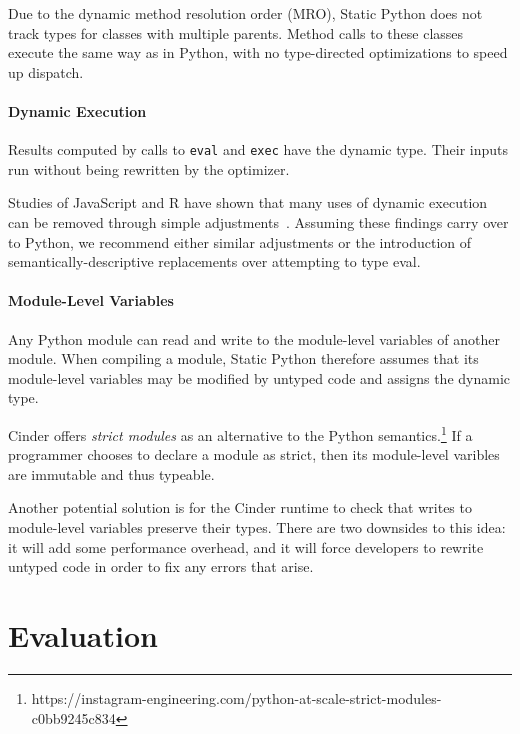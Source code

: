 \documentclass[english,cleveref,submission]{programming}
\newcommand{\SP}{Static Python}
\newcommand{\code}[1]{\texttt{#1}}
\begin{document}
Due to the dynamic method resolution order (MRO),
\SP{} does not track types for classes with multiple parents.
Method calls to these classes execute the same way as
in Python, with no type-directed optimizations to speed up dispatch.


\paragraph{Dynamic Execution}
Results computed by calls to \code{eval} and \code{exec}
have the dynamic type.
Their inputs run without being rewritten
by the optimizer.

Studies of JavaScript and R have shown that many uses of dynamic execution
can be removed through simple adjustments~\cite{rhbv-ecoop-2011,gdkkv-oopsla-2021,mrmv-esop-2012}.
Assuming these findings carry over to Python, we recommend either similar
adjustments or the introduction of semantically-descriptive replacements
over attempting to type eval.


\paragraph{Module-Level Variables}

Any Python module can read and write to the module-level variables of another module.
When compiling a module, \SP{} therefore assumes that its module-level variables
may be modified by untyped code and assigns the dynamic type.

Cinder offers \emph{strict modules} as an alternative to the Python
semantics.\footnote{https://instagram-engineering.com/python-at-scale-strict-modules-c0bb9245c834}
If a programmer chooses to declare a module as strict, then its module-level varibles
are immutable and thus typeable.

Another potential solution is for the Cinder runtime to check that writes to module-level variables
preserve their types.
There are two downsides to this idea:
it will add some performance overhead,
and it will force developers to rewrite untyped code in order to fix any errors that arise.


\section{Evaluation}
\label{s:eval}
\end{document}
